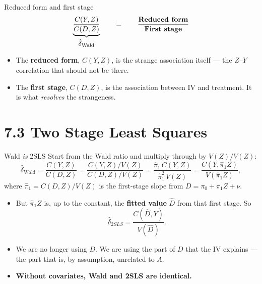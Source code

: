 \documentclass[
  11pt,
  ignorenonframetext,
  aspectratio=169,
]{beamer}
\providecommand{\tightlist}{%
  \setlength{\itemsep}{0pt}\setlength{\parskip}{0pt}}
\begin{document}
\begin{frame}{Reduced form and first stage}
\protect{}\label{reduced-form-and-first-stage}
\[
\underbrace{\frac{C(Y,Z)}{C(D,Z)}}_{\textstyle \hat\delta_{\text{Wald}}}
\qquad=\qquad
\frac{\text{\textbf{Reduced form}}}{\text{\textbf{First stage}}}
\]

\begin{itemize}
\tightlist
\item
  The \textbf{reduced form}, \(C(Y,Z)\), is the strange association
  itself --- the \(Z\)--\(Y\) correlation that should not be there.
\item
  The \textbf{first stage}, \(C(D,Z)\), is the association between IV
  and treatment. It is what \emph{resolves} the strangeness.
\end{itemize}
\end{frame}

\section{7.3 Two Stage Least Squares}\label{two-stage-least-squares}

\begin{frame}{Wald \emph{is} 2SLS}
\protect{}\label{wald-is-2sls}
Start from the Wald ratio and multiply through by \(V(Z)/V(Z)\): \[
\hat\delta_{\text{Wald}}
= \frac{C(Y,Z)}{C(D,Z)}
= \frac{C(Y,Z)/V(Z)}{C(D,Z)/V(Z)}
= \frac{\hat\pi_1\,C(Y,Z)}{\hat\pi_1^{2}\, V(Z)}
= \frac{C(Y, \hat\pi_1 Z)}{V(\hat\pi_1 Z)},
\] where \(\hat\pi_1 = C(D, Z)/V(Z)\) is the first-stage slope from
\(D = \pi_0 + \pi_1 Z + \nu\).

\begin{itemize}
\tightlist
\item
  But \(\hat\pi_1 Z\) is, up to the constant, the \textbf{fitted value}
  \(\hat D\) from that first stage. So \[
  \hat\delta_{2SLS} = \frac{C(\hat D, Y)}{V(\hat D)} .
  \]
\item
  We are no longer using \(D\). We are using the part of \(D\) that the
  IV explains --- the part that is, by assumption, unrelated to \(A\).
\item
  \textbf{Without covariates, Wald and 2SLS are identical.}
\end{itemize}
\end{frame}
\end{document}
